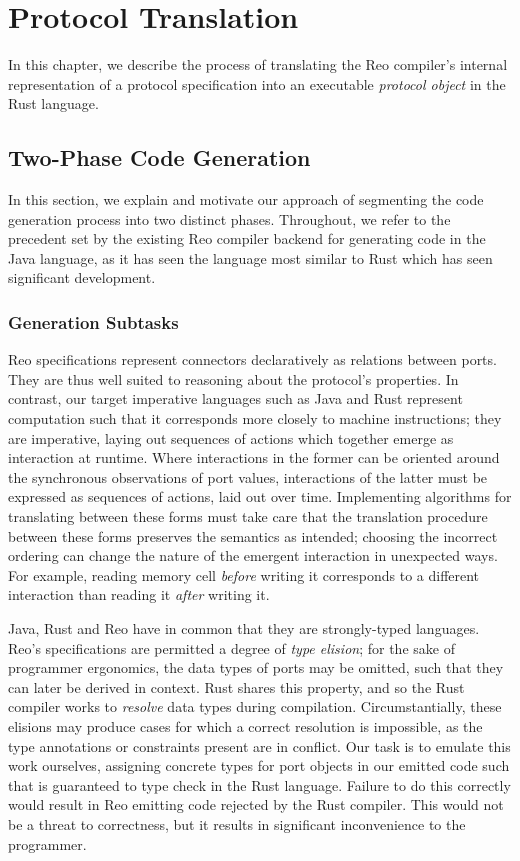 \chapter{Protocol Translation}
\label{sec:imperative_form}
In this chapter, we describe the process of translating the Reo compiler's internal representation of a protocol specification into an executable \textit{protocol object} in the Rust language.

\section{Two-Phase Code Generation}
\label{sec:two_phase}
In this section, we explain and motivate our approach of segmenting the code generation process into two distinct phases. Throughout, we refer to the precedent set by the existing Reo compiler backend for generating code in the Java language, as it has seen the language most similar to Rust which has seen significant development.   

\subsection{Generation Subtasks}
\label{sec:sub_tasks}
Reo specifications represent connectors declaratively as relations between ports. They are thus well suited to reasoning about the protocol's properties. In contrast, our target imperative languages such as Java and Rust represent computation such that it corresponds more closely to machine instructions; they are imperative, laying out sequences of actions which together emerge as interaction at runtime. Where interactions in the former can be oriented around the synchronous observations of port values, interactions of the latter must be expressed as sequences of actions, laid out over time. Implementing algorithms for translating between these forms must take care that the translation procedure between these forms preserves the semantics as intended; choosing the incorrect ordering can change the nature of the emergent interaction in unexpected ways. For example, reading memory cell \textit{before} writing it corresponds to a different interaction than reading it \textit{after} writing it. 

Java, Rust and Reo have in common that they are strongly-typed languages. Reo's specifications are permitted a degree of \textit{type elision}; for the sake of programmer ergonomics, the data types of ports may be omitted, such that they can later be derived in context. Rust shares this property, and so the Rust compiler works to \textit{resolve} data types during compilation. Circumstantially, these elisions may produce cases for which a correct resolution is impossible, as the type annotations or constraints present are in conflict. Our task is to emulate this work ourselves, assigning concrete types for port objects in our emitted code such that is guaranteed to type check in the Rust language. Failure to do this correctly would result in Reo emitting code rejected by the Rust compiler. This would not be a threat to correctness, but it results in significant inconvenience to the programmer.


